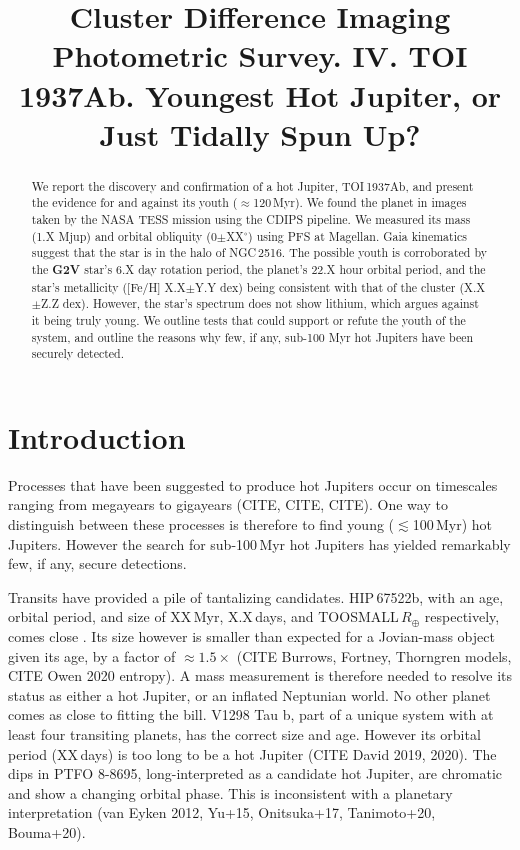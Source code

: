 \documentclass[12pt,twocolumn,tighten]{aastex63}
\begin{document}

\title{
  Cluster Difference Imaging Photometric Survey. IV.
  TOI 1937Ab. Youngest Hot Jupiter, or Just Tidally Spun Up?
}



\begin{abstract}
  We report the discovery and confirmation of a hot Jupiter,
  TOI\,1937Ab, and present the evidence for and against its youth
  ($\approx$120\,Myr).
  We found the planet in images taken by the NASA TESS mission
  using the CDIPS pipeline.
  We measured its mass (1.X Mjup) and orbital obliquity
  (0$\pm$XX$^\circ$) using PFS at Magellan.
  Gaia kinematics suggest that the star is in the halo of NGC\,2516.
  The possible youth is corroborated by the {\bf G2V} star's 6.X day
  rotation period, the planet's 22.X hour orbital period, and the
  star's metallicity ([Fe/H] X.X$\pm$Y.Y dex) being consistent with
  that of the cluster (X.X$\pm$Z.Z dex).
  However, the star's spectrum does not show lithium, which argues
  against it being truly young.
  We outline tests that could support or refute the youth of the
  system, and outline the reasons why few, if any, sub-100 Myr hot
  Jupiters have been securely detected.
\end{abstract}




\section{Introduction}

Processes that have been suggested to produce hot Jupiters occur on
timescales ranging from megayears to gigayears (CITE, CITE, CITE).
One way to distinguish between these processes is therefore to find
young ($\lesssim$100\,Myr) hot Jupiters.  However the search for
sub-100\,Myr hot Jupiters has yielded remarkably few, if any, secure
detections.

Transits have provided a pile of tantalizing candidates.  HIP\,67522b,
with an age, orbital period, and size of XX\,Myr, X.X\,days, and
TOOSMALL\,$R_\oplus$ respectively, comes close
\citep{rizzuto_tess_2020}.  Its
size however is smaller than expected for a Jovian-mass object given
its age, by a factor of $\approx1.5\times$ (CITE Burrows, Fortney,
Thorngren models, CITE Owen 2020 entropy).  A mass measurement is
therefore needed to resolve its status as either a hot Jupiter, or an
inflated Neptunian world.  No other planet comes as close to fitting
the bill.  V1298 Tau b, part of a unique system with at least four
transiting planets, has the correct size and age. However its orbital
period (XX\,days) is too long to be a hot Jupiter (CITE David 2019,
2020).  The dips in PTFO 8-8695, long-interpreted as a candidate hot
Jupiter, are chromatic and show a changing orbital phase.  This is
inconsistent with a planetary interpretation (van Eyken 2012, Yu+15,
Onitsuka+17, Tanimoto+20, Bouma+20).
\end{document}
